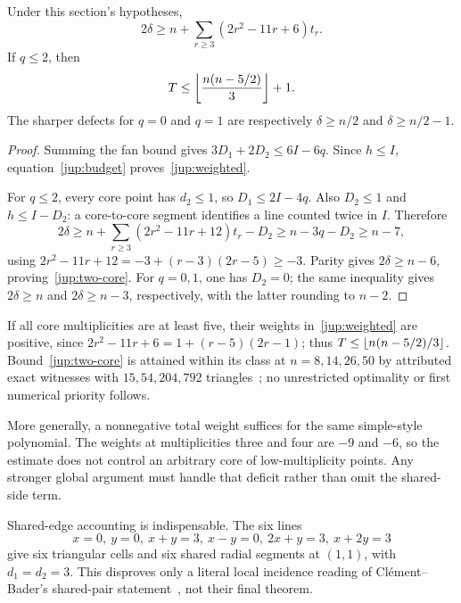 \begin{theorem}
\label{jup:upper}
Under this section's hypotheses,
\begin{equation}
 2\delta\ge n+\sum_{r\ge3}(2r^2-11r+6)t_r.
 \label{jup:weighted}
\end{equation}
If $q\le2$, then
\begin{equation}
 T\le\left\lfloor\frac{n(n-5/2)}3\right\rfloor+1.
 \label{jup:two-core}
\end{equation}
The sharper defects for $q=0$ and $q=1$ are respectively $\delta\ge n/2$ and $\delta\ge n/2-1$.
\end{theorem}
\begin{proof}
Summing the fan bound gives $3D_1+2D_2\le6I-6q$. Since $h\le I$, equation~\eqref{jup:budget} proves~\eqref{jup:weighted}.

For $q\le2$, every core point has $d_2\le1$, so $D_1\le2I-4q$. Also $D_2\le1$ and $h\le I-D_2$: a core-to-core segment identifies a line counted twice in $I$. Therefore
\[
 2\delta\ge n+\sum_{r\ge3}(2r^2-11r+12)t_r-D_2
 \ge n-3q-D_2\ge n-7,
\]
using $2r^2-11r+12=-3+(r-3)(2r-5)\ge-3$. Parity gives $2\delta\ge n-6$, proving~\eqref{jup:two-core}. For $q=0,1$, one has $D_2=0$; the same inequality gives $2\delta\ge n$ and $2\delta\ge n-3$, respectively, with the latter rounding to $n-2$.
\end{proof}

If all core multiplicities are at least five, their weights in~\eqref{jup:weighted} are positive, since $2r^2-11r+6=1+(r-5)(2r-1)$; thus $T\le\left\lfloor n(n-5/2)/3\right\rfloor$. Bound~\eqref{jup:two-core} is attained within its class at $n=8,14,26,50$ by attributed exact witnesses with $15,54,204,792$ triangles~\cite{maiorana2026,parpalakutkinGallery2026}; no unrestricted optimality or first numerical priority follows.

More generally, a nonnegative total weight suffices for the same simple-style polynomial. The weights at multiplicities three and four are $-9$ and $-6$, so the estimate does not control an arbitrary core of low-multiplicity points. Any stronger global argument must handle that deficit rather than omit the shared-side term.

Shared-edge accounting is indispensable. The six lines
\[
 x=0,\ y=0,\ x+y=3,\ x-y=0,\ 2x+y=3,\ x+2y=3
\]
give six triangular cells and six shared radial segments at $(1,1)$, with $d_1=d_2=3$. This disproves only a literal local incidence reading of Cl\'ement--Bader's shared-pair statement~\cite{clementbader2007}, not their final theorem.


